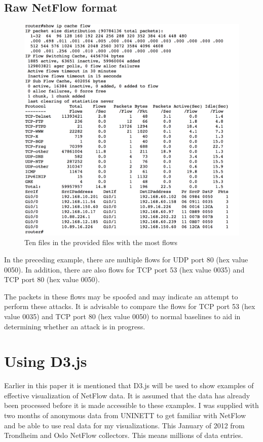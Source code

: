 \newpage


\subsection{Raw NetFlow format}

\begin{figure}[h!]
\includegraphics[scale=0.5]{netflow_ddos}
\caption{Ten files in the provided files with the most flows}
\end{figure}

In the preceding example, there are multiple flows for UDP port 80 (hex value 0050). In addition, there are also flows for TCP port 53 (hex value 0035) and TCP port 80 (hex value 0050).

The packets in these flows may be spoofed and may indicate an attempt to perform these attacks. It is advisable to compare the flows for TCP port 53 (hex value 0035) and TCP port 80 (hex value 0050) to normal baselines to aid in determining whether an attack is in progress.


\section{Using D3.js}
Earlier in this paper it is mentioned that D3.js will be used to show examples of effective visualization of NetFlow data. It is assumed that the data has already been processed before it is made accessible to these examples. I was supplied with two months of anonymous data from UNINETT to get familiar with NetFlow and be able to use real data for my visualizations. This January of 2012 from Trondheim and Oslo NetFlow collectors. This means millions of data entries. 

